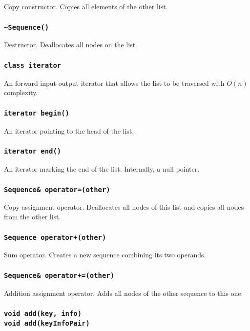 ﻿\documentclass{article}
\begin{document}
Copy constructor. Copies all elements of the other list.

\subsubsection{{\tt \~{}Sequence()}}

Destructor. Deallocates all nodes on the list.

\subsubsection{{\tt class iterator}}

An forward input-output iterator that allows the list to be traversed with
$O(n)$ complexity.

\subsubsection{{\tt iterator begin()}}

An iterator pointing to the head of the list.

\subsubsection{{\tt iterator end()}}

An iterator marking the end of the list. Internally, a null pointer.

\subsubsection{{\tt Sequence\& operator=(other)}}

Copy assignment operator. Deallocates all nodes of this list and copies all
nodes from the other list.

\subsubsection{{\tt Sequence operator+(other)}}

Sum operator. Creates a new sequence combining its two operands.

\subsubsection{{\tt Sequence\& operator+=(other)}}

Addition assignment operator. Adds all nodes of the other sequence to this one.

\subsubsection{{\tt void add(key, info)}\\
{\tt void add(keyInfoPair)}}
\end{document}
